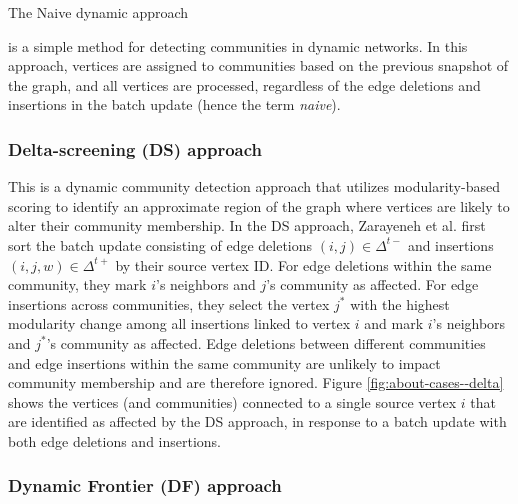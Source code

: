 The Naive dynamic approach is a simple method for detecting communities in dynamic networks. In this approach, vertices are assigned to communities based on the previous snapshot of the graph, and all vertices are processed, regardless of the edge deletions and insertions in the batch update (hence the term \textit{naive}).


\subsubsection{Delta-screening (DS) approach \cite{com-zarayeneh21}}
\label{sec:delta-screening}

This is a dynamic community detection approach that utilizes modularity-based scoring to identify an approximate region of the graph where vertices are likely to alter their community membership. In the DS approach, Zarayeneh et al. first sort the batch update consisting of edge deletions $(i, j) \in \Delta^{t-}$ and insertions $(i, j, w) \in \Delta^{t+}$ by their source vertex ID. For edge deletions within the same community, they mark $i$'s neighbors and $j$'s community as affected. For edge insertions across communities, they select the vertex $j^*$ with the highest modularity change among all insertions linked to vertex $i$ and mark $i$'s neighbors and $j^*$'s community as affected. Edge deletions between different communities and edge insertions within the same community are unlikely to impact community membership and are therefore ignored. Figure \ref{fig:about-cases--delta} shows the vertices (and communities) connected to a single source vertex $i$ that are identified as affected by the DS approach, in response to a batch update with both edge deletions and insertions.


\subsubsection{Dynamic Frontier (DF) approach \cite{sahu2024shared}}
\label{sec:about-frontier}

